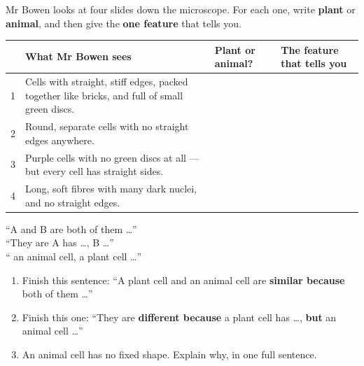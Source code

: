 \documentclass[12pt,a4paper]{article}
\begin{document}

\noindent Mr Bowen looks at four slides down the microscope. For each one, write
\textbf{plant} or \textbf{animal}, and then give the \textbf{one feature} that tells
you.

\vspace{8pt}
\noindent
\begin{tabularx}{\textwidth}{|c|>{\raggedright\arraybackslash}X|p{2.7cm}|p{4.3cm}|}
  \hline
  & \textbf{What Mr Bowen sees} & \textbf{Plant or animal?} & \textbf{The feature that tells you} \\
  \hline
  1 & Cells with straight, stiff edges, packed together like bricks, and full of small green discs. \rule[-1.1em]{0pt}{2.4em} & & \\ \hline
  2 & Round, separate cells with no straight edges anywhere. \rule[-1.1em]{0pt}{2.4em} & & \\ \hline
  3 & Purple cells with no green discs at all --- but every cell has straight sides. \rule[-1.1em]{0pt}{2.4em} & & \\ \hline
  4 & Long, soft fibres with many dark nuclei, and no straight edges. \rule[-1.1em]{0pt}{2.4em} & & \\ \hline
\end{tabularx}

\vspace{10pt}


\begin{wordhelp}
  ``A and B are  both of them \ldots''\\
  ``They are  A has \ldots,  B \ldots''\\
  `` an animal cell, a plant cell \ldots''
\end{wordhelp}

\begin{enumerate}[label=\arabic*., itemsep=12pt]
  \item Finish this sentence: ``A plant cell and an animal cell are
        \textbf{similar because} both of them \ldots''
  \item Finish this one: ``They are \textbf{different because} a plant cell has
        \ldots, \textbf{but} an animal cell \ldots''
  \item An animal cell has no fixed shape. Explain why, in one full sentence.
\end{enumerate}
\end{document}
